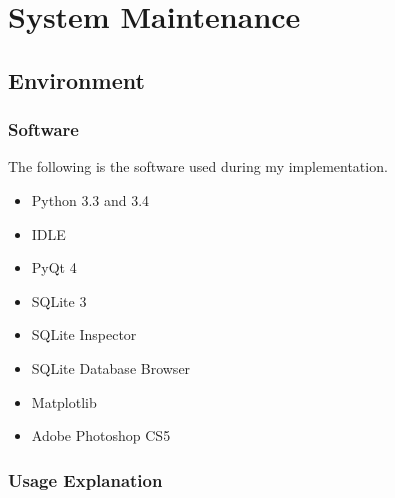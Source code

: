 \chapter{System Maintenance}

\section{Environment}

\subsection{Software}

The following is the software used during my implementation.

\begin{itemize}
\item Python 3.3 and 3.4
\item IDLE
\item PyQt 4
\item SQLite 3
\item SQLite Inspector
\item SQLite Database Browser
\item Matplotlib
\item Adobe Photoshop CS5
\end{itemize}

\subsection{Usage Explanation}

